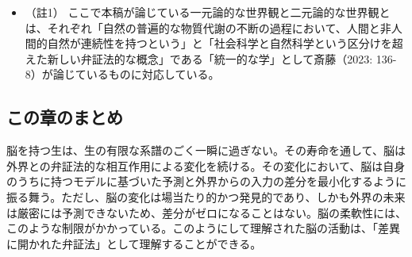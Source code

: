\begin{itemize}
\tightlist
\item
  （註1）
  ここで本稿が論じている一元論的な世界観と二元論的な世界観とは、それぞれ「自然の普遍的な物質代謝の不断の過程において、人間と非人間的自然が連続性を持つという」と「社会科学と自然科学という区分けを超えた新しい\mbox{弁証法}的な概念」である「統一的な学」として斎藤（2023:
  136-8）が論じているものに対応している。
\end{itemize}

\subsection{この章のまとめ}\label{ux3053ux306eux7ae0ux306eux307eux3068ux3081}

脳を持つ生は、生の有限な系譜のごく一瞬に過ぎない。その寿命を通して、脳は外界との\mbox{弁証法}的な相互作用による変化を続ける。その変化において、脳は自身のうちに持つモデルに基づいた予測と外界からの入力の差分を最小化するように振る舞う。ただし、脳の変化は場当たり的かつ発見的であり、しかも外界の未来は厳密には予測できないため、差分がゼロになることはない。脳の柔軟性には、このような制限がかかっている。このようにして理解された脳の活動は、「差異に開かれた\mbox{弁証法}」として理解することができる。
